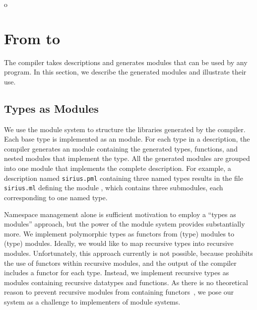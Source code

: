 o\section{From \padsmlbig{} to \ocamlbig{}}
\label{sec:padsml-impl}
The \padsml{} compiler takes descriptions and generates \ocaml{}
modules that can be used by any \ocaml{} program.  In this section, we
describe the generated modules and illustrate their use.

\subsection{Types as Modules}
\label{sec:gen-code}

We use the \ocaml{} module system to structure the libraries generated
by the \padsml{} compiler.  Each \padsml{} base type is implemented as
an \ocaml{} module.  For each \padsml{} type in a description, the
\padsml{} compiler generates an \ocaml{} module containing the
generated \ocaml{} types, functions, and nested modules that implement
the \padsml{} type.  All the generated modules are grouped into one
module that implements the complete description.  For example, a
\padsml{} description named \texttt{sirius.pml} containing three named
types results in the \ocaml{} file \texttt{sirius.ml} defining the
module , which contains three submodules, each
corresponding to one named type.

Namespace management alone is sufficient motivation to employ a
``types as modules'' approach, but the power of the \ml{} module
system provides substantially more.  We implement polymorphic
\padsml{} types as functors from (type) modules to (type) modules.
Ideally, we would like to map recursive \padsml{} types into recursive
modules.  Unfortunately, this approach currently is not possible, because
\ocaml{} prohibits the use of functors within recursive modules,
and the output of the \padsml{} compiler includes a functor for each
type.  Instead, we implement recursive types as modules containing
recursive datatypes and functions.  As there is no theoretical reason
to prevent recursive modules from containing functors~\cite{dreyer-thesis}, we
pose our system as a challenge to implementers of module systems.

